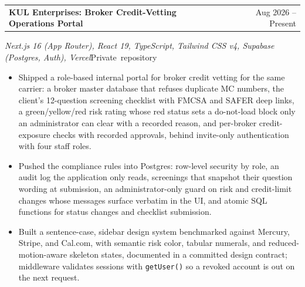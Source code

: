 \documentclass[letterpaper,10pt]{article}
\makeatletter
\newcommand{\EntryGapAfter}{2pt}
\newcommand{\IfEmpty}[3]{\if\relax\detokenize{#1}\relax#2\else#3\fi}
\newcommand{\projectheading}[4]{%
  \Needspace*{4\baselineskip}%
  \begin{tabularx}{\textwidth}{@{}X r@{}}
    \textbf{#1} & #2 \\
  \end{tabularx}\par
  {\textit{#3}\IfEmpty{#4}{}{\hspace*{1.5em plus 1filll}\mbox{\small #4}}}\par
  \nopagebreak\vspace{\EntryGapAfter}%
}
\makeatother
\begin{document}
\projectheading{KUL Enterprises: Broker Credit-Vetting Operations Portal}{Aug 2026 -- Present}
{Next.js 16 (App Router), React 19, TypeScript, Tailwind CSS v4, Supabase (Postgres, Auth), Vercel}{Private repository}
\begin{itemize}
\item Shipped a role-based internal portal for broker credit vetting for the same carrier: a broker master database that refuses duplicate MC numbers, the client's 12-question screening checklist with FMCSA and SAFER deep links, a green/yellow/red risk rating whose red status sets a do-not-load block only an administrator can clear with a recorded reason, and per-broker credit-exposure checks with recorded approvals, behind invite-only authentication with four staff roles.
\item Pushed the compliance rules into Postgres: row-level security by role, an audit log the application only reads, screenings that snapshot their question wording at submission, an administrator-only guard on risk and credit-limit changes whose messages surface verbatim in the UI, and atomic SQL functions for status changes and checklist submission.
\item Built a sentence-case, sidebar design system benchmarked against Mercury, Stripe, and Cal.com, with semantic risk color, tabular numerals, and reduced-motion-aware skeleton states, documented in a committed design contract; middleware validates sessions with \texttt{getUser()} so a revoked account is out on the next request.
\end{itemize}
\end{document}

